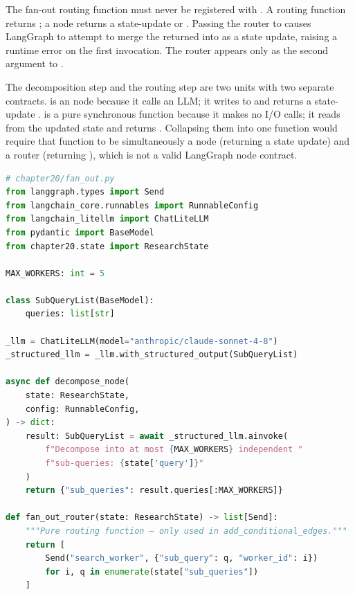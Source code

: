 \begin{warningbox}
The fan-out routing function must never be registered with .
A routing function returns ; a node returns a state-update
 or . Passing the router to  causes
LangGraph to attempt to merge the returned  into
 as a state update, raising a runtime error on the
first invocation. The router appears only as the second argument to
.
\end{warningbox}

The decomposition step and the routing step are two units with
two separate contracts.  is an  node
because it calls an LLM; it writes  to
 and returns a state-update .
 is a pure synchronous function because it makes
no I/O calls; it reads  from the updated state and
returns . Collapsing them into one function would require
that function to be simultaneously a node (returning a state update) and a
router (returning ), which is not a valid LangGraph node
contract.

\begin{lstlisting}[language=Python,
  caption={Decomposition node and pure fan-out routing function},
  label={lst:send-fanout}]
# chapter20/fan_out.py
from langgraph.types import Send
from langchain_core.runnables import RunnableConfig
from langchain_litellm import ChatLiteLLM
from pydantic import BaseModel
from chapter20.state import ResearchState

MAX_WORKERS: int = 5

class SubQueryList(BaseModel):
    queries: list[str]

_llm = ChatLiteLLM(model="anthropic/claude-sonnet-4-8")
_structured_llm = _llm.with_structured_output(SubQueryList)

async def decompose_node(
    state: ResearchState,
    config: RunnableConfig,
) -> dict:
    result: SubQueryList = await _structured_llm.ainvoke(
        f"Decompose into at most {MAX_WORKERS} independent "
        f"sub-queries: {state['query']}"
    )
    return {"sub_queries": result.queries[:MAX_WORKERS]}

def fan_out_router(state: ResearchState) -> list[Send]:
    """Pure routing function — only used in add_conditional_edges."""
    return [
        Send("search_worker", {"sub_query": q, "worker_id": i})
        for i, q in enumerate(state["sub_queries"])
    ]
\end{lstlisting}

